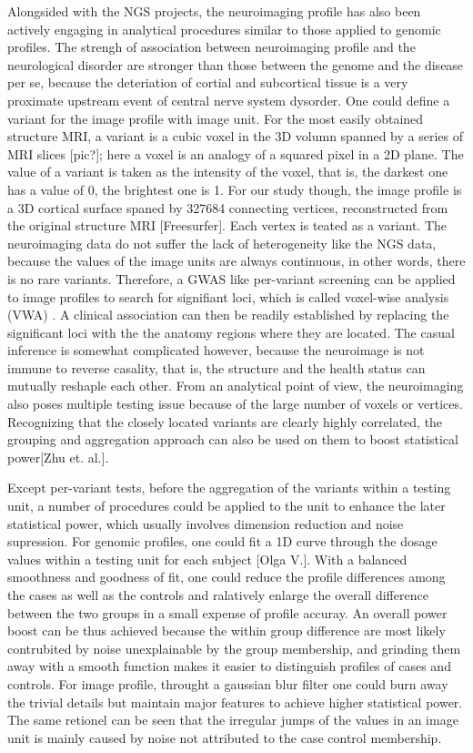 \documentclass[twocolumn]{article}
\begin{document}
Alongsided with the NGS projects, the neuroimaging profile has also been actively engaging in analytical procedures similar to those applied to genomic profiles. The strengh of association between neuroimaging profile and the neurological disorder are stronger than those between the genome and the disease per se, because the deteriation of cortial and subcortical tissue is a very proximate upstream event of central nerve system dysorder. One could define a variant for the image profile with image unit. For the most easily obtained structure MRI, a variant is a cubic voxel in the 3D volumn spanned by a series of MRI slices [pic?]; here a voxel is an analogy of a squared pixel in a 2D plane. The value of a variant is taken as the intensity of the voxel, that is, the darkest one has a value of 0, the brightest one is 1. For our study though, the image profile is a 3D cortical surface spaned by 327684 connecting vertices, reconstructed from the original structure MRI [Freesurfer]. Each vertex is teated as a variant. The neuroimaging data do not suffer the lack of heterogeneity like the NGS data, because the values of the image units are always continuous, in other words, there is no rare variants. Therefore, a GWAS like per-variant screening can be applied to image profiles to search for signifiant loci, which is called voxel-wise analysis (VWA) \cite{VWA}. A clinical association can then be readily established by replacing the significant loci with the the anatomy regions where they are located. The casual inference is somewhat complicated however, because the neuroimage is not immune to reverse casality, that is, the structure and the health status can mutually reshaple each other. From an analytical point of view, the neuroimaging also poses multiple testing issue because of the large number of voxels or vertices. Recognizing that the closely located variants are clearly highly correlated, the grouping and aggregation approach can also be used on them to boost statistical power[Zhu et. al.].

Except per-variant tests, before the aggregation of the variants within a testing unit, a number of procedures could be applied to the unit to enhance the later statistical power, which usually involves dimension reduction and noise supression. For genomic profiles, one could fit a 1D curve through the dosage values within a testing unit for each subject [Olga V.]. With a balanced smoothness and goodness of fit, one could reduce the profile differences among the cases as well as the controls and ralatively enlarge the overall difference between the two groups in a small expense of profile accuray. An overall power boost can be thus achieved because the within group difference are most likely contrubited by noise unexplainable by the group membership, and grinding them away with a smooth function makes it easier to distinguish profiles of cases and controls. For image profile, throught a gaussian blur filter one could burn away the trivial details but maintain major features to achieve higher statistical power. The same retionel can be seen that the irregular jumps of the values in an image unit is mainly caused by noise not attributed to the case control membership. 
\end{document}
